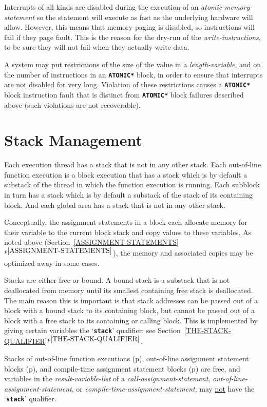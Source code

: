 \documentclass[12pt]{article}
\newcommand{\TT}[1]{{\tt \bfseries #1}}
\newcommand{\itemref}[1]{\ref{#1}$^{p\pageref{#1}}$}
\newcommand{\pagref}[1]{p\pageref{#1}}
\begin{document}
Interrupts of all kinds are disabled during the execution of an
{\em atomic-memory-statement} so the statement will execute as
fast as the underlying hardware will allow.  However, this means
that memory paging is disabled, so instructions will fail if
they page fault.  This is the reason for the dry-run of the
{\em write-instructions}, to be sure they will not fail
when they actually write data.

A system may put restrictions of the size of the value in
a {\em length-variable}, and on the number of instructions
in an \TT{*ATOMIC*} block, in order to ensure that interrupts
are not disabled for very long.  Violation of these restrictions
causes a \TT{*ATOMIC*} block instruction fault that is distinct
from \TT{*ATOMIC*} block failures described above (such violations
are not recoverable).

\section{Stack Management}
\label{STACK-MANAGEMENT}

Each execution thread has a stack that is not in any other
stack.  Each out-of-line function
execution is a block execution that has a stack which is
by default a substack of the thread in which the function
execution is running.  Each subblock in turn has a stack
which is by default a substack of the stack of its containing block.
And each global area has a stack that is not in any other stack.

Conceptually, the assignment statements in a block each allocate memory for
their variable to the current block stack and copy values to these
variables.  As noted above (Section~\itemref{ASSIGNMENT-STATEMENTS}),
the memory and associated copies may be
optimized away in some cases.

Stacks are either free or bound.\label{FREE-STACK}
A bound stack is a substack that is
not deallocated from memory until its smallest containing free stack is
deallocated.  The main reason this is important is that stack addresses
can be passed out of a block with a bound stack to its containing block,
but cannot be passed out of a block with a free stack to its containing
or calling block.  This is implemented by giving certain
variables the `\TT{stack}' qualifier: see
Section~\itemref{THE-STACK-QUALIFIER}.

Stacks of out-of-line function executions
(\pagref{OUT-OF-LINE-FUNCTIONS}),
out-of-line assignment statement blocks
(\pagref{OUT-OF-LINE-ASSIGNMENT-STATEMENTS}),
and
compile-time assignment statement blocks
(\pagref{COMPILE-TIME-ASSIGNMENT-STATEMENTS})
are free, and variables in the {\em result-variable-list}
of a {\em call-assignment-statement},
{\em out-of-line-assignment-statement}, or
{\em compile-time-assignment-statement},
may \underline{not} have the `\TT{stack}' qualifier.
\end{document}
